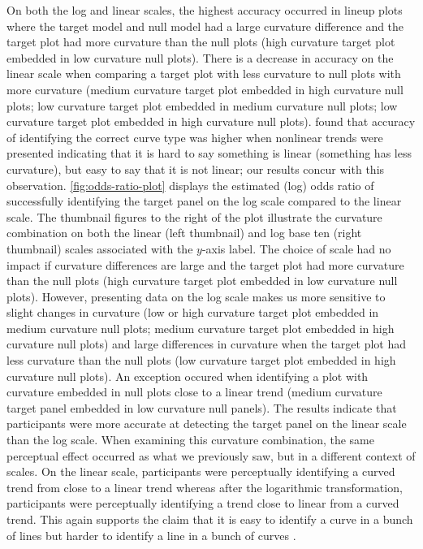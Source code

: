 \documentclass[12pt]{article}
\begin{document}
On both the log and linear scales, the highest accuracy occurred in
lineup plots where the target model and null model had a large curvature
difference and the target plot had more curvature than the null plots
(high curvature target plot embedded in low curvature null plots). There
is a decrease in accuracy on the linear scale when comparing a target
plot with less curvature to null plots with more curvature (medium
curvature target plot embedded in high curvature null plots; low
curvature target plot embedded in medium curvature null plots; low
curvature target plot embedded in high curvature null plots).
\citet{best_perception_2007} found that accuracy of identifying the
correct curve type was higher when nonlinear trends were presented
indicating that it is hard to say something is linear (something has
less curvature), but easy to say that it is not linear; our results
concur with this observation. \cref{fig:odds-ratio-plot} displays the
estimated (log) odds ratio of successfully identifying the target panel
on the log scale compared to the linear scale. The thumbnail figures to
the right of the plot illustrate the curvature combination on both the
linear (left thumbnail) and log base ten (right thumbnail) scales
associated with the \(y\)-axis label. The choice of scale had no impact
if curvature differences are large and the target plot had more
curvature than the null plots (high curvature target plot embedded in
low curvature null plots). However, presenting data on the log scale
makes us more sensitive to slight changes in curvature (low or high
curvature target plot embedded in medium curvature null plots; medium
curvature target plot embedded in high curvature null plots) and large
differences in curvature when the target plot had less curvature than
the null plots (low curvature target plot embedded in high curvature
null plots). An exception occured when identifying a plot with curvature
embedded in null plots close to a linear trend (medium curvature target
panel embedded in low curvature null panels). The results indicate that
participants were more accurate at detecting the target panel on the
linear scale than the log scale. When examining this curvature
combination, the same perceptual effect occurred as what we previously
saw, but in a different context of scales. On the linear scale,
participants were perceptually identifying a curved trend from close to
a linear trend whereas after the logarithmic transformation,
participants were perceptually identifying a trend close to linear from
a curved trend. This again supports the claim that it is easy to
identify a curve in a bunch of lines but harder to identify a line in a
bunch of curves \citep{best_perception_2007}.
\end{document}
